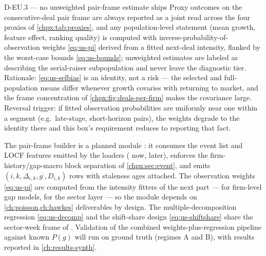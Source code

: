 \begin{decision}{D-EU.3 --- no unweighted pair-frame estimate ships}
Proxy outcomes on the consecutive-deal pair frame are always reported as a joint read across the
four proxies of \cref{chpx:tab:proxies}, and any population-level statement (mean growth,
feature effect, ranking quality) is computed with inverse-probability-of-observation weights
\cref{eq:us-pi} derived from a fitted next-deal intensity, flanked by the worst-case bounds
\cref{eq:us-bounds}; unweighted estimates are labeled as describing the serial-raiser
subpopulation and never leave the diagnostic tier. Rationale: \cref{eq:us-selbias} is an
identity, not a risk --- the selected and full-population means differ whenever growth covaries
with returning to market, and the frame concentration of \cref{chpx:fig:deals-per-firm} makes
the covariance large. Reversal trigger: if fitted observation probabilities are uniformly
near one within a segment (e.g.\ late-stage, short-horizon pairs), the weights degrade to the
identity there and this box's requirement reduces to reporting that fact.
\end{decision}

\begin{codehooks}
The pair-frame builder is a planned module : it consumes the event list and LOCF
features emitted by the loaders ( now, 
later), enforces the firm-history/gap-macro block separation of \cref{chpx:sec:event}, and emits
$(i, k, \Delta_{i,k}, g^{\cdot}, D_{i,k})$ rows with staleness ages attached. The observation
weights \cref{eq:us-pi} are computed from the intensity fitters of the next part ---
 for firm-level gap models,  for the sector layer
--- so the module depends on \cref{ch:poisson,ch:hawkes} deliverables by design. The
multiple-decomposition regression \cref{eq:us-decomp} and the shift-share design
\cref{eq:us-shiftshare} share the sector-week frame of .
Validation of the combined weights-plus-regression pipeline against known $P(g)$ will run on
 ground truth (regimes A and B), with results reported in
\cref{ch:results-synth}.
\end{codehooks}
